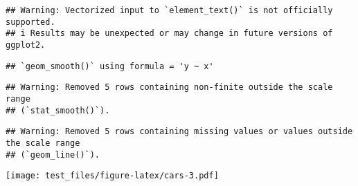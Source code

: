 \documentclass[
]{article}
\begin{document}
\begin{verbatim}
## Warning: Vectorized input to `element_text()` is not officially supported.
## i Results may be unexpected or may change in future versions of ggplot2.
\end{verbatim}

\begin{verbatim}
## `geom_smooth()` using formula = 'y ~ x'
\end{verbatim}

\begin{verbatim}
## Warning: Removed 5 rows containing non-finite outside the scale range
## (`stat_smooth()`).
\end{verbatim}

\begin{verbatim}
## Warning: Removed 5 rows containing missing values or values outside the scale range
## (`geom_line()`).
\end{verbatim}

\texttt{[image: test\_files/figure-latex/cars-3.pdf]}
\end{document}
